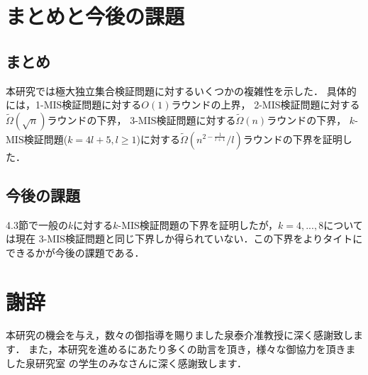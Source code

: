 \documentclass[12pt]{thesis}
\theoremstyle{definition}
\begin{document}

\chapter{まとめと今後の課題}
\section{まとめ}
本研究では極大独立集合検証問題に対するいくつかの複雑性を示した．
具体的には，1-MIS検証問題に対する$O(1)$ラウンドの上界，
2-MIS検証問題に対する$\tilde{\Omega} (\sqrt{n})$ラウンドの下界，
3-MIS検証問題に対する$\tilde{\Omega} (n)$ラウンドの下界，
$k$-MIS検証問題($k = 4l + 5, l \geq 1$)に対する$\tilde{\Omega}\left(n^{2 - \frac{1}{l + 1}}/l\right)$ラウンドの下界を証明した．

\section{今後の課題}
4.3節で一般の$k$に対する$k$-MIS検証問題の下界を証明したが，$k = 4,...,8$については現在
3-MIS検証問題と同じ下界しか得られていない．この下界をよりタイトにできるかが今後の課題である．
\newpage

\chapter*{謝辞}
本研究の機会を与え，数々の御指導を賜りました泉泰介准教授に深く感謝致します．
また，本研究を進めるにあたり多くの助言を頂き，様々な御協力を頂きました泉研究室
の学生のみなさんに深く感謝致します．

\newpage


\end{document}
